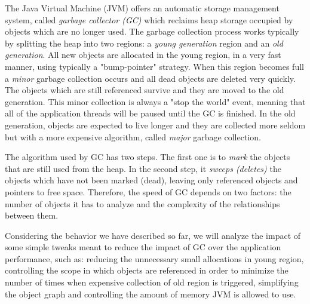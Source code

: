 \documentclass[a4paper,twoside]{article}
\begin{document}
The Java Virtual Machine (JVM) \cite{lindholm:2014} offers an automatic storage management system, called {\it garbage collector (GC)} which reclaims heap storage occupied by objects which are no longer used.
The garbage collection process \cite{gc:oracle} works typically by splitting the heap into two regions: a {\it young generation} region and an {\it old generation}.
All new objects are allocated in the young region, in a very fast manner, using typically a "bump-pointer" strategy. When this region becomes full  a {\it minor} garbage collection occurs and all dead objects are deleted very quickly. The objects which are still referenced survive and they  are moved to the old generation. This minor collection is always a "stop the world" event, meaning that all of the application threads will be paused until the GC is finished. 
In the old generation, objects are expected to live longer and they are collected more seldom but with a more expensive algorithm, called {\it major} garbage collection.

The algorithm used by GC has two steps. The first one is to {\it mark} the objects that are still used from the heap. In the second step, it {\it sweeps (deletes)} the objects which have not been marked (dead), leaving only referenced objects and pointers to free space. 
Therefore, the speed of GC depends on two factors: the number of objects it has to analyze and the complexity of the relationships between them. %

Considering the behavior we have described so far, we will analyze the impact of some simple tweaks
meant to reduce the impact of GC over the application performance, such as:
reducing the unnecessary small allocations in young region, controlling the scope in which objects are referenced in order to minimize the number of times when expensive collection of old region is triggered, simplifying the object graph and controlling the amount of memory JVM is allowed to use.





{\small
}
\end{document}
